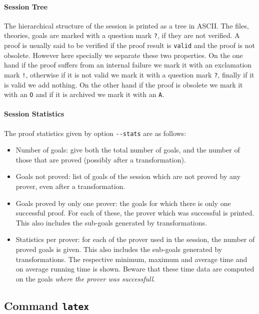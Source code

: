 \paragraph{Session Tree}

The hierarchical structure of the session is printed as a tree in
ASCII. The files, theories, goals are marked with a question mark
\verb|?|, if they are not verified. A proof is usually said to be
verified if the proof result is \verb|valid| and the proof is not
obsolete. However here specially we separate these two properties. On
the one hand if the proof suffers from an internal failure we mark it
with an exclamation mark \verb|!|, otherwise if it is not valid we
mark it with a question mark \verb|?|, finally if it is valid we add
nothing. On the other hand if the proof is obsolete we mark it with an
\verb|O| and if it is archived we mark it with an \verb|A|.


\paragraph{Session Statistics}

The proof statistics given by option \verb|--stats| are as follows:
\begin{itemize}
\item Number of goals: give both the total number of goals, and the
  number of those that are proved (possibly after a transformation).
\item Goals not proved: list of goals of the session which are not
  proved by any prover, even after a transformation.
\item Goals proved by only one prover: the goals for which there is only
  one successful proof. For each of these, the prover which was
  successful is printed. This also includes the sub-goals generated by
  transformations.
\item Statistics per prover: for each of the prover used in the
  session, the number of proved goals is given. This also includes the
  sub-goals generated by transformations. The respective minimum,
  maximum and average time and on average running time is
  shown. Beware that these time data are computed on the
  goals \emph{where the prover was successfull}.
\end{itemize}


\subsection{Command \texttt{latex}}

